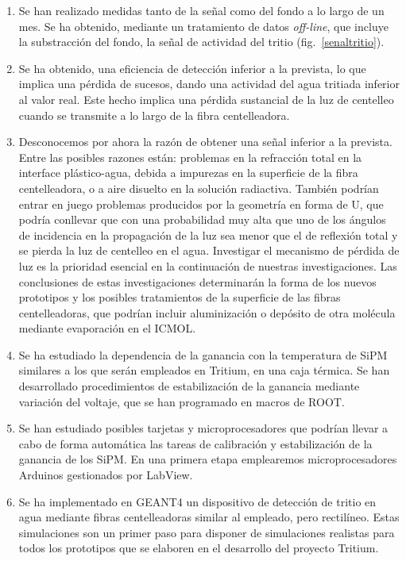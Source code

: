 \begin{enumerate}
\item Se han realizado medidas tanto de la señal como del fondo a lo largo de un mes. Se ha obtenido, mediante un tratamiento de datos \textit{off-line}, que incluye la substracción del fondo, la señal de actividad del tritio (fig.~\ref{senaltritio}). 

\item Se ha obtenido, una eficiencia de detección inferior a  la prevista,  lo que implica una pérdida de sucesos, dando una  actividad del agua tritiada  inferior al valor real. Este hecho implica una pérdida  sustancial de la luz de centelleo cuando se transmite a lo largo de  la fibra centelleadora.

\item Desconocemos por ahora la razón de obtener una señal inferior a la prevista. Entre las posibles razones están: problemas en la refracción total en la interface plástico-agua, debida a impurezas en la superficie de la fibra centelleadora, o a aire disuelto en la solución radiactiva. También podrían entrar en juego   problemas producidos por  la geometría en forma de U, que podría conllevar que con una probabilidad muy alta  que uno de los  ángulos de incidencia en la propagación de la luz sea menor que el de reflexión total y se pierda la luz de centelleo en el agua.  Investigar el mecanismo de pérdida de luz es la prioridad esencial en la continuación de nuestras investigaciones. Las conclusiones de estas investigaciones determinarán la forma de los nuevos prototipos y los posibles tratamientos de la superficie de las fibras centelleadoras, que podrían incluir aluminización o depósito de otra molécula mediante evaporación en el ICMOL.

\item Se ha estudiado la dependencia de la ganancia con la temperatura de  SiPM similares a los que serán empleados en Tritium, en una caja térmica. Se han desarrollado procedimientos de estabilización de la ganancia mediante variación del voltaje, que se han programado en macros de ROOT.

\item Se han estudiado posibles tarjetas y microprocesadores que podrían llevar a cabo de forma automática las tareas de calibración y estabilización de la ganancia de los SiPM. En una primera etapa emplearemos  microprocesadores Arduinos gestionados por LabView. 

\item Se ha implementado en GEANT4 un dispositivo de detección de tritio en agua mediante fibras centelleadoras similar al empleado, pero rectilíneo.  Estas simulaciones son un primer paso para disponer de simulaciones realistas para todos los prototipos que se elaboren en el desarrollo del proyecto Tritium.




\end{enumerate}